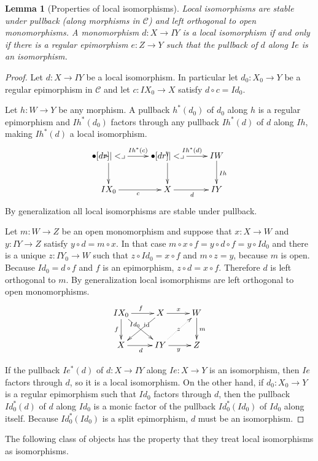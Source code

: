 \documentclass[sort&compress]{elsarticle}
\theoremstyle{plain}
\newtheorem{lemma}[theorem]{Lemma}
\theoremstyle{definition}
\theoremstyle{remark}
\newcommand\cat\mathcal
\begin{document}
\begin{lemma}[Properties of local isomorphisms] Local isomorphisms are stable under pullback (along morphisms in $\cat C$) and left orthogonal to open monomorphisms. A monomorphism $d:X\to IY$ is a local isomorphism if and only if there is a regular epimorphism $e:Z\to Y$ such that the pullback of $d$ along $Ie$ is an isomorphism. \end{lemma}

\begin{proof} Let $d:X\to IY$ be a local isomorphism. In particular let $d_0:X_0 \to Y$ be a regular epimorphism in $\cat C$ and let $c:IX_0 \to X$ satisfy $d\circ c= Id_0$.

Let $h: W\to Y$ be any morphism. A pullback $h^*(d_0)$ of $d_0$ along $h$ is a regular epimorphism and $Ih^*(d_0)$ factors through any pullback $Ih^*(d)$ of $d$ along $Ih$, making $Ih^*(d)$ a local isomorphism.
\[ \xymatrix{
\bullet\ar[d]\ar[r]^{Ih^*(c)} \pb & \bullet \ar[r]^{Ih^*(d)} \ar[d]\pb & IW\ar[d]^{Ih}\\
IX_0 \ar[r]_c & X \ar[r]_d & IY
}\]
By generalization all local isomorphisms are stable under pullback.

Let $m: W\to Z$ be an open monomorphism and suppose that $x: X\to W$ and $y: IY\to Z$ satisfy $y\circ d = m\circ x$. In that case $m \circ x\circ f = y\circ d\circ f = y\circ Id_0$ and there is a unique $z: IY_0 \to W$ such that $z\circ Id_0 = x\circ f$ and $m\circ z = y$, because $m$ is open. Because $Id_0 = d\circ f$ and $f$ is an epimorphism, $z\circ d = x\circ f$. Therefore $d$ is left orthogonal to $m$. By generalization local isomorphisms are left orthogonal to open monomorphisms.
\[ \xymatrix{
IX_0 \ar[r]^f \ar[dr]|(.35){Id_0}\ar[d]_f & X \ar[r]^x \ar[dl]|(.35)\id & W \ar[d]^m \\
X \ar[r]_{d}  & IY\ar[r]_y \ar@{.>}[ur]|z & Z
}\]

If the pullback $Ie^*(d)$ of $d:X\to IY$ along $Ie:X\to Y$ is an isomorphism, then $Ie$ factors through $d$, so it is a local isomorphism. On the other hand, if $d_0:X_0 \to Y$ is a regular epimorphism such that $Id_0$ factors through $d$, then the pullback $Id_0^*(d)$ of $d$ along $Id_0$ is a monic factor of the pullback $Id_0^*(Id_0)$ of $Id_0$ along itself. Because $Id_0^*(Id_0)$ is a split epimorphism, $d$ must be an isomorphism.
\end{proof}

The following class of objects has the property that they treat local isomorphisms as isomorphisms.
\end{document}
